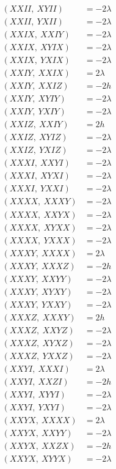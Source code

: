 \documentclass{article}
\begin{document}
\begin{align*}
  (XXII,\ XYII) &= - 2 \lambda \\
  (XXII,\ YXII) &= - 2 \lambda \\
  (XXIX,\ XXIY) &= - 2 \lambda \\
  (XXIX,\ XYIX) &= - 2 \lambda \\
  (XXIX,\ YXIX) &= - 2 \lambda \\
  (XXIY,\ XXIX) &= 2 \lambda \\
  (XXIY,\ XXIZ) &= - 2 h \\
  (XXIY,\ XYIY) &= - 2 \lambda \\
  (XXIY,\ YXIY) &= - 2 \lambda \\
  (XXIZ,\ XXIY) &= 2 h \\
  (XXIZ,\ XYIZ) &= - 2 \lambda \\
  (XXIZ,\ YXIZ) &= - 2 \lambda \\
  (XXXI,\ XXYI) &= - 2 \lambda \\
  (XXXI,\ XYXI) &= - 2 \lambda \\
  (XXXI,\ YXXI) &= - 2 \lambda \\
  (XXXX,\ XXXY) &= - 2 \lambda \\
  (XXXX,\ XXYX) &= - 2 \lambda \\
  (XXXX,\ XYXX) &= - 2 \lambda \\
  (XXXX,\ YXXX) &= - 2 \lambda \\
  (XXXY,\ XXXX) &= 2 \lambda \\
  (XXXY,\ XXXZ) &= - 2 h \\
  (XXXY,\ XXYY) &= - 2 \lambda \\
  (XXXY,\ XYXY) &= - 2 \lambda \\
  (XXXY,\ YXXY) &= - 2 \lambda \\
  (XXXZ,\ XXXY) &= 2 h \\
  (XXXZ,\ XXYZ) &= - 2 \lambda \\
  (XXXZ,\ XYXZ) &= - 2 \lambda \\
  (XXXZ,\ YXXZ) &= - 2 \lambda \\
  (XXYI,\ XXXI) &= 2 \lambda \\
  (XXYI,\ XXZI) &= - 2 h \\
  (XXYI,\ XYYI) &= - 2 \lambda \\
  (XXYI,\ YXYI) &= - 2 \lambda \\
  (XXYX,\ XXXX) &= 2 \lambda \\
  (XXYX,\ XXYY) &= - 2 \lambda \\
  (XXYX,\ XXZX) &= - 2 h \\
  (XXYX,\ XYYX) &= - 2 \lambda \\

\end{align*}
\end{document}
